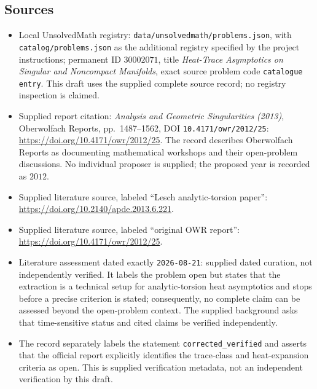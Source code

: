 \documentclass[11pt]{article}
\begin{document}
\subsection{Sources}
\begin{itemize}
\item Local UnsolvedMath registry: \texttt{data/unsolvedmath/problems.json}, with \texttt{catalog/problems.json} as the additional registry specified by the project instructions; permanent ID \(30002071\), title \emph{Heat-Trace Asymptotics on Singular and Noncompact Manifolds}, exact source problem code \texttt{catalogue entry}. This draft uses the supplied complete source record; no registry inspection is claimed.
\item Supplied report citation: \emph{Analysis and Geometric Singularities (2013)}, Oberwolfach Reports, pp.~1487--1562, DOI \texttt{10.4171/owr/2012/25}: \url{https://doi.org/10.4171/owr/2012/25}. The record describes Oberwolfach Reports as documenting mathematical workshops and their open-problem discussions. No individual proposer is supplied; the proposed year is recorded as \(2012\).
\item Supplied literature source, labeled ``Lesch analytic-torsion paper'': \url{https://doi.org/10.2140/apde.2013.6.221}.
\item Supplied literature source, labeled ``original OWR report'': \url{https://doi.org/10.4171/owr/2012/25}.
\item Literature assessment dated exactly \texttt{2026-08-21}: supplied dated curation, not independently verified. It labels the problem open but states that the extraction is a technical setup for analytic-torsion heat asymptotics and stops before a precise criterion is stated; consequently, no complete claim can be assessed beyond the open-problem context. The supplied background asks that time-sensitive status and cited claims be verified independently.
\item The record separately labels the statement \texttt{corrected\_verified} and asserts that the official report explicitly identifies the trace-class and heat-expansion criteria as open. This is supplied verification metadata, not an independent verification by this draft.
\end{itemize}
\end{document}
